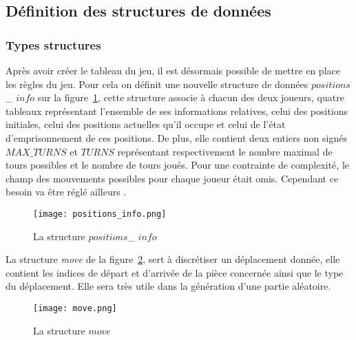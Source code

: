\documentclass[11pt]{article}
\begin{document}
        \subsection{Définition des structures de données}
            \subsubsection{Types structures } %
                Après avoir créer le tableau du jeu, il est désormais possible de mettre en place les règles du jeu. Pour cela on définit une nouvelle structure de données $positions$\_ $info$ sur la figure~\ref{figure7}, cette structure associe à chacun des deux joueurs, quatre tableaux représentant l'ensemble de ses informations relatives, celui des positions initiales, celui des positions actuelles qu'il occupe et celui de l'état d'emprisonnement de ces positions. De plus, elle contient deux entiers non signés $MAX\_TURNS$ et $TURNS$ représentant respectivement le nombre maximal de tours possibles et le nombre de tours joués. Pour une contrainte de complexité, le champ des mouvements possibles pour chaque joueur était omis. Cependant ce besoin va être réglé ailleurs . 
                \begin{figure}[h]
                \centering
                \texttt{[image: positions\_info.png]}
                \caption{La structure $positions$\_ $info$ }
                \label{figure7}
                \end{figure}
                \newpage
                La structure \textit{move} de la figure~\ref{figure8}, sert à discrétiser un déplacement donnée, elle contient les indices de départ et d'arrivée de la pièce concernée ainsi que le type du déplacement. Elle sera très utile dans la génération d'une partie aléatoire.
                \begin{figure}[h]
                \centering
                \texttt{[image: move.png]}
                \caption{La structure $move$ }
                \label{figure8}
                \end{figure}
            
\end{document}
